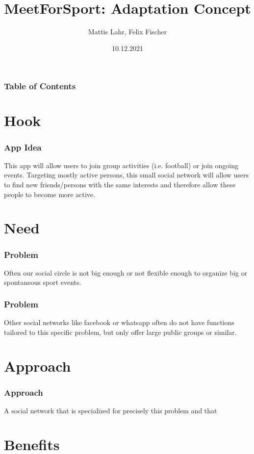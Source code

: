 \documentclass[aspectratio=169]{beamer}
\title{MeetForSport: Adaptation Concept}
\author{Mattis Lahr, Felix Fischer}
\date{10.12.2021}
\begin{document}
\maketitle



\begin{frame}
    \frametitle{Table of Contents}
    \tableofcontents
\end{frame}



\section{Hook}
\begin{frame}
\frametitle{App Idea}
This app will allow users to join group activities (i.e. football) or join ongoing events.
Targeting mostly active persons, this small social network will allow users  to find new friends/persons with the same interests and therefore allow these people to become more active.
\end{frame}

\section{Need}
	\begin{frame}
		\frametitle{Problem}
		Often our social circle is not big enough or not flexible enough to organize big or spontaneous sport events.
	\end{frame}

	\begin{frame}
		\frametitle{Problem}
		Other social networks like facebook or whatsapp often do not have functions tailored to this specific problem, but only offer large public groups or similar. 
	\end{frame}

\section{Approach}

	\begin{frame}
		\frametitle{Approach}
		A social network that is specialized for precisely this problem and that
	\end{frame}


\section{Benefits}
\end{document}
